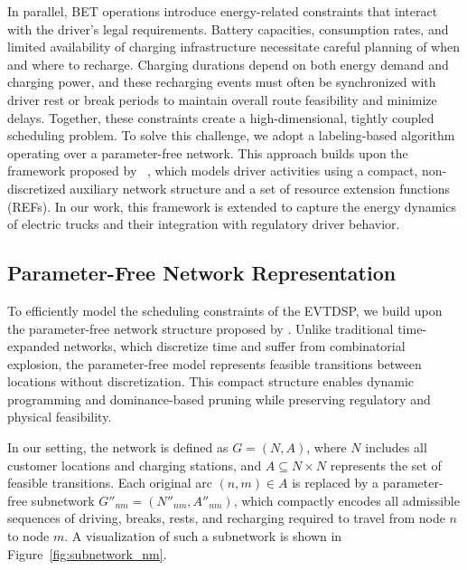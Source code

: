 \documentclass[trsc,dblanonrev]{informs4}
\begin{document}
In parallel, BET operations introduce energy-related constraints that interact with the driver's legal requirements. Battery capacities, consumption rates, and limited availability of charging infrastructure necessitate careful planning of when and where to recharge. Charging durations depend on both energy demand and charging power, and these recharging events must often be synchronized with driver rest or break periods to maintain overall route feasibility and minimize delays. Together, these constraints create a high-dimensional, tightly coupled scheduling problem. To solve this challenge, we adopt a labeling-based algorithm operating over a parameter-free network. This approach builds upon the framework proposed by ~\cite{goel2017exact}, which models driver activities using a compact, non-discretized auxiliary network structure and a set of resource extension functions (REFs). In our work, this framework is extended to capture the energy dynamics of electric trucks and their integration with regulatory driver behavior.

\subsection{Parameter-Free Network Representation}\label{sec:ParamFreeNetwork}

To efficiently model the scheduling constraints of the EVTDSP, we build upon the parameter-free network structure proposed by \citet{goel2017exact}. Unlike traditional time-expanded networks, which discretize time and suffer from combinatorial explosion, the parameter-free model represents feasible transitions between locations without discretization. This compact structure enables dynamic programming and dominance-based pruning while preserving regulatory and physical feasibility.

In our setting, the network is defined as \( G = (N, A) \), where \( N \) includes all customer locations and charging stations, and \( A \subseteq N \times N \) represents the set of feasible transitions. Each original arc \( (n, m) \in A \) is replaced by a parameter-free subnetwork \( G''_{nm} = (N''_{nm}, A''_{nm}) \), which compactly encodes all admissible sequences of driving, breaks, rests, and recharging required to travel from node \( n \) to node \( m \). A visualization of such a subnetwork is shown in Figure~\ref{fig:subnetwork_nm}.
\end{document}
